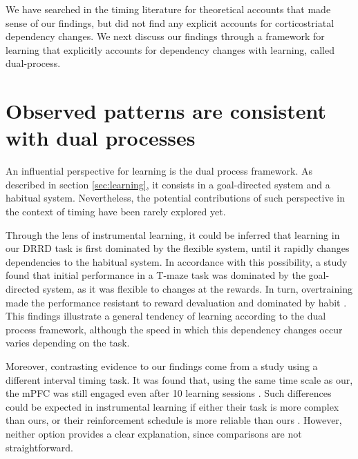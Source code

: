     We have searched in the timing literature for theoretical accounts that made sense of our findings, but did not find any explicit accounts for corticostriatal dependency changes. We next discuss our findings through a framework for learning that explicitly accounts for dependency changes with learning, called dual-process. 
    
\section{Observed patterns are consistent with dual processes}
    An influential perspective for learning is the dual process framework. As described in section \ref{sec:learning}, it consists in a goal-directed system and a habitual system. Nevertheless, the potential contributions of such perspective in the context of timing have been rarely explored yet.
    
    Through the lens of instrumental learning, it could be inferred that learning in our DRRD task is first dominated by the flexible system, until it rapidly changes dependencies to the habitual system. In accordance with this possibility, a study found that initial performance in a T-maze task was dominated by the goal-directed system, as it was flexible to changes at the rewards. In turn, overtraining made the performance resistant to reward devaluation and dominated by habit \cite{smith2013dual}. This findings illustrate a general tendency of learning according to the dual process framework, although the speed in which this dependency changes occur varies depending on the task.
    
    Moreover, contrasting evidence to our findings come from a study using a different interval timing task. It was found that, using the same time scale as our, the mPFC was still engaged even after 10 learning sessions \cite{narayanan2006reversible}. Such differences could be expected in instrumental learning if either their task is more complex than ours, or their reinforcement schedule is more reliable than ours \cite{dickinson2015instrumental}. However, neither option provides a clear explanation, since comparisons are not straightforward.
    
